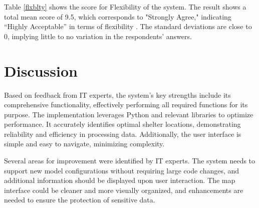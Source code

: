 \documentclass[12pt,a4paper,]{article}
\begin{document}
	\begin{table}[h!]
		\centering
		\caption{Flexibility Evaluation}
		\label{flxblty}
		\renewcommand{\arraystretch}{1.2}
	\end{table}
	
	Table \ref{flxblty} shows the score for Flexibility of the system. The result shows a total mean score of 9.5, which corresponds to "Strongly Agree," indicating “Highly Acceptable” in terms of flexibility . The standard deviations are close to 0, implying little to no variation in the respondents’ answers.
	
	

\section{Discussion}
	Based on feedback from IT experts, the system's key strengths include its comprehensive functionality, effectively performing all required functions for its purpose. The implementation leverages Python and relevant libraries to optimize performance. It accurately identifies optimal shelter locations, demonstrating reliability and efficiency in processing data. Additionally, the user interface is simple and easy to navigate, minimizing complexity.
	
	Several areas for improvement were identified by IT experts. The system needs to support new model configurations without requiring large code changes, and additional information should be displayed upon user interaction. The map interface could be cleaner and more visually organized, and enhancements are needed to ensure the protection of sensitive data.
	
\end{document}
